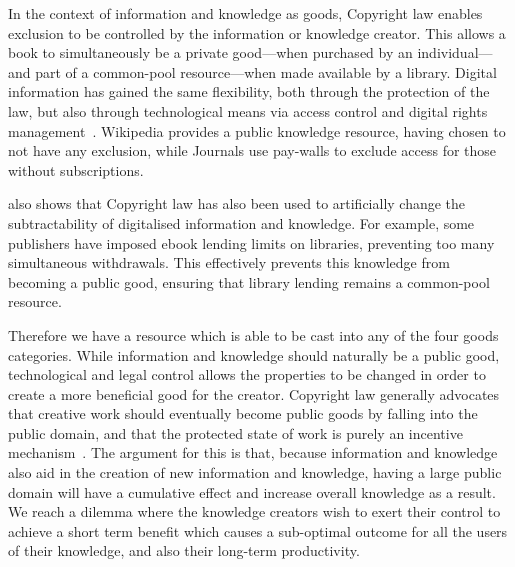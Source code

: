 In the context of information and knowledge as goods, Copyright law enables exclusion to be controlled by the information or knowledge creator. 
This allows a book to simultaneously be a private good---when purchased by an individual---and part of a common-pool resource---when made available by a library. 
Digital information has gained the same flexibility, both through the protection of the law, but also through technological means via access control and digital rights management~\citep{Lessig2004}. 
Wikipedia provides a public knowledge resource, having chosen to not have any exclusion, while Journals use pay-walls to exclude access for those without subscriptions.

\citet{Lessig2004} also shows that Copyright law has also been used to artificially change the subtractability of digitalised information and knowledge. 
For example, some publishers have imposed ebook lending limits on libraries, preventing too many simultaneous withdrawals. 
This effectively prevents this knowledge from becoming a public good, ensuring that library lending remains a common-pool resource.

Therefore we have a resource which is able to be cast into any of the four goods categories. 
While information and knowledge should naturally be a public good, technological and legal control allows the properties to be changed in order to create a more beneficial good for the creator. 
Copyright law generally advocates that creative work should eventually become public goods by falling into the public domain, and that the protected state of work is purely an incentive mechanism~\citep{Samuelson2006}. 
The argument for this is that, because information and knowledge also aid in the creation of new information and knowledge, having a large public domain will have a cumulative effect and increase overall knowledge as a result. 
We reach a dilemma where the knowledge creators wish to exert their control to achieve a short term benefit which causes a sub-optimal outcome for all the users of their knowledge, and also their long-term productivity.


